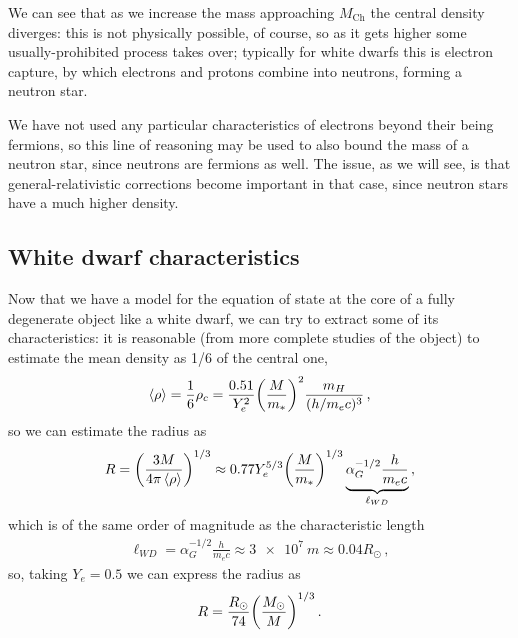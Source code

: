 \documentclass[main.tex]{subfiles}
\begin{document}
We can see that as we increase the mass approaching \(M _{\text{Ch}}\) the central density diverges: this is not physically possible, of course, so as it gets higher some usually-prohibited process takes over; typically for white dwarfs this is electron capture, by which electrons and protons combine into neutrons, forming a neutron star.

We have not used any particular characteristics of electrons beyond their being fermions, so this line of reasoning may be used to also bound the mass of a neutron star, since neutrons are fermions as well. 
The issue, as we will see, is that general-relativistic corrections become important in that case, since neutron stars have a much higher density.


\subsection{White dwarf characteristics}

Now that we have a model for the equation of state at the core of a fully degenerate object like a white dwarf, we can try to extract some of its characteristics: it is reasonable (from more complete studies of the object) to estimate the mean density as 1/6 of the central one,
%
\begin{align}
\expval{\rho } = \frac{1}{6} \rho_{c}
= \frac{\num{.51}}{Y_e^2} \qty(\frac{M}{m_{*}})^2
\frac{m_H}{( h / m_e c)^3}
\,,
\end{align}
%
so we can estimate the radius as 
%
\begin{align}
R = \qty(\frac{3 M }{4 \pi \expval{\rho }})^{1/3} 
\approx \num{.77} Y_e^{5/3} \qty(\frac{M}{m_{*}})^{1/3} \underbrace{\alpha_{G}^{-1/2} \frac{h}{m_e c} }_{\ell_{WD}}
\,,
\end{align}
%
which is of the same order of magnitude as the characteristic length
%
\begin{align}
\ell_{WD} = \alpha_{G}^{-1/2} \frac{h}{m_e c} \approx \SI{3e7}{m} \approx \num{0.04} R_{\odot}
\,,
\end{align}
%
so, taking \(Y_e = 0.5\) we can express the radius as 
%
\begin{align}
R = \frac{R_{\odot}}{74} \qty(\frac{M_{\odot}}{M})^{1/3}
\,.
\end{align}
\end{document}
